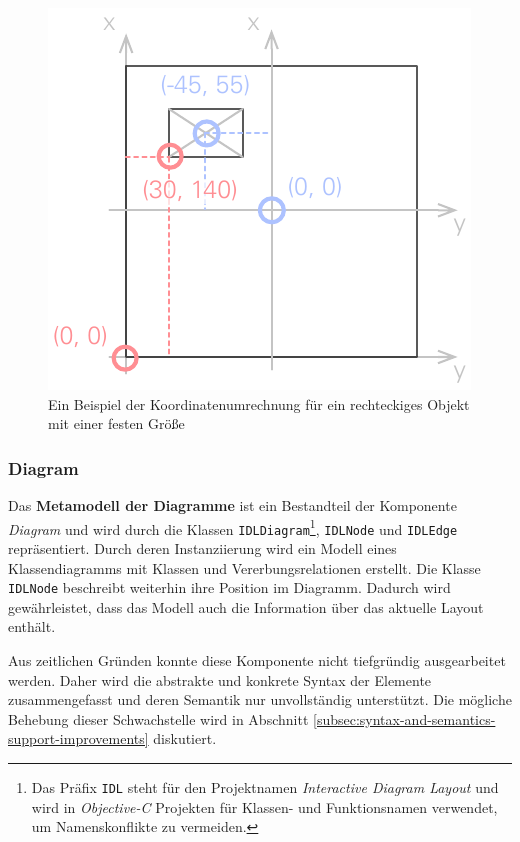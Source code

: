 \begin{figure}[hbt]
    \centering
    \includegraphics{assets/coordinates-conversion}
    \caption{Ein Beispiel der Koordinatenumrechnung für ein rechteckiges Objekt mit einer festen Größe}
    \label{fig:coordinates-conversion}
\end{figure}

\subsubsection{Diagram}
\label{subsubsec:component-diagram}

Das \textbf{Metamodell der Diagramme} ist ein Bestandteil der Komponente \textit{Diagram} und wird durch die Klassen \texttt{IDLDiagram}\footnote{Das Präfix \texttt{IDL} steht für den Projektnamen \textit{Interactive Diagram Layout} und wird in \textit{Objective-C} Projekten für Klassen- und Funktionsnamen verwendet, um Namenskonflikte zu vermeiden.}, \texttt{IDLNode} und \texttt{IDLEdge} repräsentiert. Durch deren Instanziierung wird ein Modell eines Klassendiagramms mit Klassen und Vererbungsrelationen erstellt. Die Klasse \texttt{IDLNode} beschreibt weiterhin ihre Position im Diagramm. Dadurch wird gewährleistet, dass das Modell auch die Information über das aktuelle Layout enthält.

Aus zeitlichen Gründen konnte diese Komponente nicht tiefgründig ausgearbeitet werden. Daher wird die abstrakte und konkrete Syntax der Elemente zusammengefasst und deren Semantik nur unvollständig unterstützt. Die mögliche Behebung dieser Schwachstelle wird in Abschnitt \ref{subsec:syntax-and-semantics-support-improvements} diskutiert.


